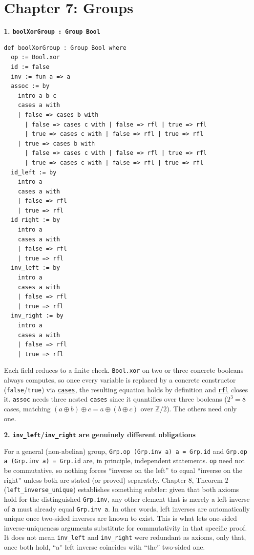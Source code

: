 \section{Chapter 7: Groups}\label{sec:15-appendix-solutions:06-chapter-7:1}

\textbf{1. \texttt{boolXorGroup : Group Bool}}

\begin{lstlisting}
def boolXorGroup : Group Bool where
  op := Bool.xor
  id := false
  inv := fun a => a
  assoc := by
    intro a b c
    cases a with
    | false => cases b with
      | false => cases c with | false => rfl | true => rfl
      | true => cases c with | false => rfl | true => rfl
    | true => cases b with
      | false => cases c with | false => rfl | true => rfl
      | true => cases c with | false => rfl | true => rfl
  id_left := by
    intro a
    cases a with
    | false => rfl
    | true => rfl
  id_right := by
    intro a
    cases a with
    | false => rfl
    | true => rfl
  inv_left := by
    intro a
    cases a with
    | false => rfl
    | true => rfl
  inv_right := by
    intro a
    cases a with
    | false => rfl
    | true => rfl
\end{lstlisting}

Each field reduces to a finite check. \texttt{Bool.xor} on two or three concrete booleans always computes, so once every variable is replaced by a concrete constructor (\texttt{false}/\texttt{true}) via \href{https://lean-lang.org/doc/reference/latest/Tactic-Proofs/Tactic-Reference/}{\texttt{cases}}, the resulting equation holds by definition and \href{https://lean-lang.org/doc/reference/latest/Tactic-Proofs/Tactic-Reference/}{\texttt{rfl}} closes it. \texttt{assoc} needs three nested \texttt{cases} since it quantifies over three booleans (\(2^3 = 8\) cases, matching \((a \oplus b) \oplus c = a \oplus (b \oplus c)\) over \(\mathbb{Z}/2\)). The others need only one.

\textbf{2. \texttt{inv\_\allowbreak{}left}/\texttt{inv\_\allowbreak{}right} are genuinely different obligations}

For a general (non-abelian) group, \texttt{Grp.op (Grp.inv a) a = Grp.id} and \texttt{Grp.op a (Grp.inv a) = Grp.id} are, in principle, independent statements. \texttt{op} need not be commutative, so nothing forces ``inverse on the left'' to equal ``inverse on the right'' unless both are stated (or proved) separately. Chapter 8, Theorem 2 (\texttt{left\_\allowbreak{}inverse\_\allowbreak{}unique}) establishes something subtler: given that both axioms hold for the distinguished \texttt{Grp.inv}, any other element that is merely a left inverse of \texttt{a} must already equal \texttt{Grp.inv a}. In other words, left inverses are automatically unique once two-sided inverses are known to exist. This is what lets one-sided inverse-uniqueness arguments substitute for commutativity in that specific proof. It does not mean \texttt{inv\_\allowbreak{}left} and \texttt{inv\_\allowbreak{}right} were redundant as axioms, only that, once both hold, ``a'' left inverse coincides with ``the'' two-sided one.
